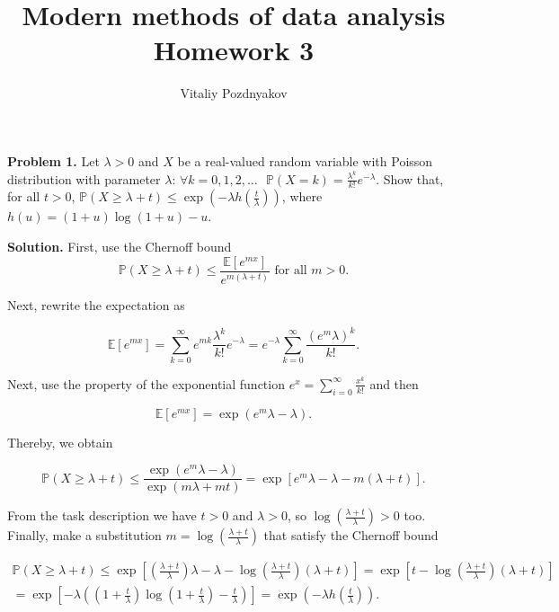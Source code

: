 \documentclass{article}
\title{Modern methods of data analysis \\Homework 3}
\author{Vitaliy Pozdnyakov}
\date{}
\begin{document}
\maketitle

\textbf{Problem 1.} Let $\lambda > 0$ and $X$ be a real-valued random variable with Poisson distribution with parameter $\lambda$:
$\forall k = 0, 1, 2, \dots \text{ } \mathbb P(X = k) = \frac{\lambda^k}{k!}e^{-\lambda}$. Show that, for all $t > 0$, $\mathbb P(X \geq \lambda + t) \leq \exp\left(-\lambda h \left( \frac{t}{\lambda} \right)\right)$, where $h(u) = (1+u)\log(1+u)-u$.

\bigskip

\textbf{Solution.} First, use the Chernoff bound
$$ \mathbb P(X \geq \lambda + t) \leq \frac{\mathbb E \left[ e^{mx} \right]}{e^{m(\lambda + t)}} \text{ for all }  m>0.$$

Next, rewrite the expectation as

$$\mathbb E \left[ e^{mx} \right] = \sum_{k=0}^\infty e^{mk}\frac{\lambda^k}{k!}e^{-\lambda} = e^{-\lambda} \sum_{k=0}^\infty \frac{(e^m\lambda)^k}{k!}.$$

Next, use the property of the exponential function $e^x = \sum_{i=0}^\infty \frac{x^k}{k!}$ and then

$$\mathbb E \left[ e^{mx} \right] = \exp(e^m\lambda - \lambda).$$

Thereby, we obtain

$$ \mathbb P(X \geq \lambda + t) \leq \frac{\exp(e^m\lambda - \lambda)}{\exp(m\lambda + mt)} = \exp[e^m\lambda - \lambda - m(\lambda + t)].$$

From the task description we have $t>0$ and $\lambda > 0$, so $\log \left( \frac{\lambda + t}{\lambda} \right) > 0$ too. Finally, make a substitution $m = \log \left( \frac{\lambda + t}{\lambda} \right)$ that satisfy the Chernoff bound

$$\begin{gathered}
\mathbb P(X \geq \lambda + t) \leq \exp\left[\left( \frac{\lambda + t}{\lambda} \right)\lambda - \lambda - \log \left( \frac{\lambda + t}{\lambda} \right)(\lambda + t)\right]  = \exp\left[ t - \log \left( \frac{\lambda + t}{\lambda} \right)(\lambda + t)\right] \\
= \exp\left[ -\lambda \left( \left(1 + \frac{t}{\lambda}\right) \log \left( 1 + \frac{t}{\lambda} \right) -\frac{t}{\lambda} \right)\right] = \exp\left(-\lambda h \left( \frac{t}{\lambda} \right)\right).
\end{gathered}$$
\bigskip
\end{document}
